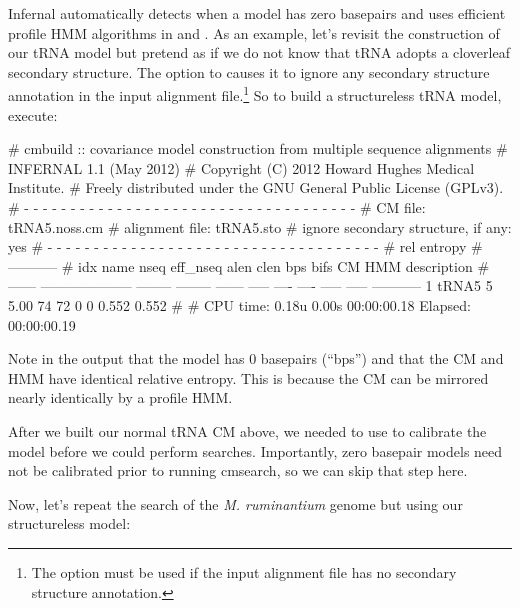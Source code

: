 Infernal automatically detects when a model has zero basepairs and
uses efficient profile HMM algorithms in  and
. As an example, let's revisit the construction of our
tRNA model but pretend as if we do not know that tRNA adopts a
cloverleaf secondary structure. The 
option to  causes it to ignore any secondary structure
annotation in the input alignment file.\footnote{The 
option must be used if the input alignment file has no secondary
structure annotation.} So to build a structureless tRNA model,
execute:


\begin{sreoutput}
# cmbuild :: covariance model construction from multiple sequence alignments
# INFERNAL 1.1 (May 2012)
# Copyright (C) 2012 Howard Hughes Medical Institute.
# Freely distributed under the GNU General Public License (GPLv3).
# - - - - - - - - - - - - - - - - - - - - - - - - - - - - - - - - - - - -
# CM file:                                            tRNA5.noss.cm
# alignment file:                                     tRNA5.sto
# ignore secondary structure, if any:                 yes
# - - - - - - - - - - - - - - - - - - - - - - - - - - - - - - - - - - - -
#                                                                      rel entropy
#                                                                      -----------
# idx    name                     nseq eff_nseq   alen  clen  bps bifs    CM   HMM description
# ------ -------------------- -------- -------- ------ ----- ---- ---- ----- ----- -----------
       1 tRNA5                       5     5.00     74    72    0    0 0.552 0.552 
#
# CPU time: 0.18u 0.00s 00:00:00.18 Elapsed: 00:00:00.19
\end{sreoutput}

Note in the output that the model has 0 basepairs (``bps'') and that
the CM and HMM have identical relative entropy. This is because the
CM can be mirrored nearly identically by a profile HMM.

After we built our normal tRNA CM above, we needed to use  to
calibrate the model before we could perform searches. Importantly,
zero basepair models need not be calibrated prior to running
cmsearch, so we can skip that step here. 

Now, let's repeat the search of the \emph{M. ruminantium} genome but
using our structureless model: 

